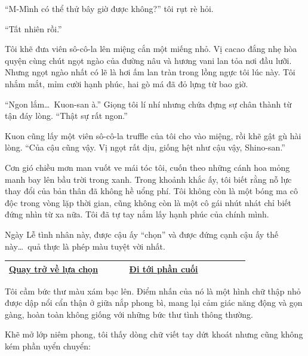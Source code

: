 \documentclass[../main.tex]{subfiles}
\begin{document}
``M-Mình có thể thử bây giờ được không?'' tôi rụt rè hỏi.

``Tất nhiên rồi.''

Tôi khẽ đưa viên sô-cô-la lên miệng cắn một miếng nhỏ. Vị cacao đắng nhẹ hòa quyện cùng chút ngọt ngào của đường nâu và hương vani lan tỏa nơi đầu lưỡi. Nhưng ngọt ngào nhất có lẽ là hơi ấm lan tràn trong lồng ngực tôi lúc này. Tôi nhắm mắt, mỉm cười hạnh phúc, hai gò má đã đỏ lựng từ bao giờ.

``Ngon lắm\dots\ Kuon-san à.'' Giọng tôi lí nhí nhưng chứa đựng sự chân thành từ tận đáy lòng. ``Thật sự rất ngon.''

Kuon cũng lấy một viên sô-cô-la truffle của tôi cho vào miệng, rồi khẽ gật gù hài lòng. ``Của cậu cũng vậy. Vị ngọt rất dịu, giống hệt như cậu vậy, Shino-san.''

Cơn gió chiều mơn man vuốt ve mái tóc tôi, cuốn theo những cánh hoa mỏng manh bay lên bầu trời trong xanh. Trong khoảnh khắc ấy, tôi biết rằng nỗ lực thay đổi của bản thân đã không hề uổng phí. Tôi không còn là một bóng ma cô độc trong vòng lặp thời gian, cũng không còn là một cô gái nhút nhát chỉ biết đứng nhìn từ xa nữa. Tôi đã tự tay nắm lấy hạnh phúc của chính mình.

Ngày Lễ tình nhân này, được cậu ấy ``chọn'' và được đứng cạnh cậu ấy thế này\dots\ quả thực là phép màu tuyệt vời nhất.

\begin{table}[H]
  \centering
  \setlength{\arrayrulewidth}{1pt}
  \begin{tabular}{|>{\centering\arraybackslash}p{0.4\linewidth}|>{\centering\arraybackslash}p{0.4\linewidth}|}
    \hline
    \hyperref[choice]{Quay trở về lựa chọn} & \hyperref[ending]{Đi tới phần cuối} \\ \hline
  \end{tabular}
\end{table}

\newpage
\label{yae}

Tôi cầm bức thư màu xám bạc lên. Điểm nhấn của nó là một hình chữ thập nhỏ được dập nổi cẩn thận ở giữa nắp phong bì, mang lại cảm giác năng động và gọn gàng, hoàn toàn không giống với những bức thư tình thông thường.

Khẽ mở lớp niêm phong, tôi thấy dòng chữ viết tay dứt khoát nhưng cũng không kém phần uyển chuyển:

\end{document}
